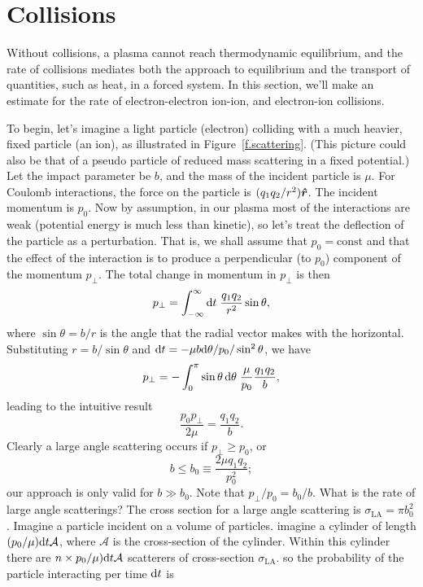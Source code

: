 \section{Collisions}\label{s.plasma-collisions}

Without collisions, a plasma cannot reach thermodynamic equilibrium, and the rate of collisions mediates both the approach to equilibrium and the transport of quantities, such as heat, in a forced system. In this section, we'll make an estimate for the rate of electron-electron ion-ion, and electron-ion collisions.

To begin, let's imagine a light particle (electron) colliding with a much heavier, fixed particle (an ion), as illustrated in Figure~\ref{f.scattering}.  (This picture could also be that of a pseudo particle of reduced mass scattering in a fixed potential.)  Let the impact parameter be $b$, and the mass of the incident particle is $\mu$.  For Coulomb interactions, the force on the particle is $(q_{1}q_{2}/r^{2})\boldsymbol{\hat{r}}$. The incident momentum is $p_{0}$. Now by assumption, in our plasma most of the interactions are weak (potential energy is much less than kinetic), so let's treat the deflection of the particle as a perturbation.  That is, we shall assume that $p_{0} = \textrm{const}$ and that the effect of the interaction is to produce a perpendicular (to $p_{0}$) component of the momentum $p_{\bot}$.  The total change in momentum in $p_{\bot}$ is then
\[ p_{\bot} = \int_{-\infty}^{\infty}\mathrm{d} t\; \frac{q_{1}q_{2}}{r^{2}}\sin\theta, \]
where $\sin\theta = b/r$ is the angle that the radial vector makes with the horizontal.  Substituting $r = b/\sin\theta$ and $\mathrm{d} t = -\mu b \mathrm{d} \theta/p_{0}/\sin^{2}\theta$, we have
\[ p_{\bot} = -\int_{0}^{\pi} \sin\theta\,\mathrm{d}\theta\; \frac{\mu}{p_{0}}\frac{q_{1}q_{2}}{b}, \]
leading to the intuitive result
\begin{equation}\label{e.pperp}
\frac{p_{0}p_{\bot}}{2\mu} = \frac{q_{1}q_{2}}{b}.
\end{equation}
Clearly a large angle scattering occurs if $p_{\bot}\ge p_{0}$, or
\begin{equation}\label{e.b0}
b \le b_{0} \equiv \frac{2\mu q_{1}q_{2}}{p_{0}^{2}};
\end{equation}
our approach is only valid for $b \gg b_{0}$.  Note that $p_{\bot}/p_{0} = b_{0}/b$. What is the rate of large angle  scatterings? The cross section for a large angle scattering is
$ \sigma_{\mathrm{LA}} = \pi b_{0}^{2}$.  Imagine a particle incident on a volume of particles.  imagine a cylinder of length $(p_{0}/\mu)\mathrm{d} t \mathcal{A}$, where $\mathcal{A}$ is the cross-section of the cylinder.  Within this cylinder there are $n\times p_{0}/\mu)\mathrm{d} t \mathcal{A}$ scatterers of cross-section $\sigma_{\mathrm{LA}}$. so the probability of the particle interacting per time $\mathrm{d} t$ is
